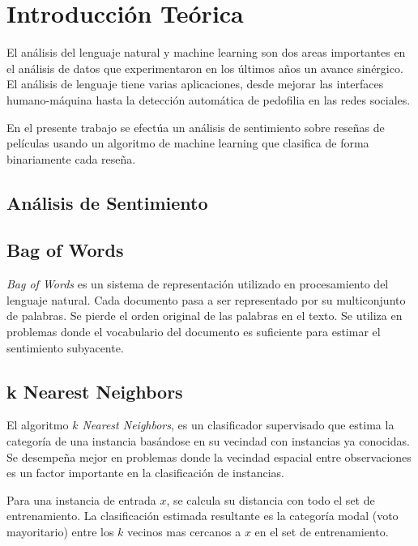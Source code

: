 \section{Introducción Teórica}%
\label{sec:introduccion_teorica}

El análisis del lenguaje natural y machine learning son dos areas
importantes en el análisis de datos que experimentaron en los últimos
años un avance sinérgico. El análisis de lenguaje tiene varias
aplicaciones, desde mejorar las interfaces humano-máquina hasta la
detección automática de pedofilia en las redes sociales.

En el presente trabajo se efectúa un análisis de sentimiento sobre
reseñas de películas usando un algoritmo de machine learning que
clasifica de forma binariamente cada reseña.

\subsection{Análisis de Sentimiento}%
\label{sub:analisis_de_sentimiento}

\subsection{Bag of Words}%
\label{sub:bag_of_words}

\textit{Bag of Words} es un sistema de representación utilizado en
procesamiento del lenguaje natural. Cada documento pasa a ser representado por
su multiconjunto de palabras. Se pierde el orden original de las palabras en el
texto. Se utiliza en problemas donde el vocabulario del documento es suficiente
para estimar el sentimiento subyacente.



\subsection{k Nearest Neighbors}%
\label{sub:k_nearest_neighbors}

El algoritmo \textit{$k$ Nearest Neighbors}, \knn{} es un clasificador
supervisado que estima la categoría de una instancia basándose en su vecindad
con instancias ya conocidas.
Se desempeña mejor en problemas donde la vecindad espacial entre
observaciones es un factor importante en la clasificación de instancias.

Para una instancia de entrada $x$, se calcula su distancia con todo el set de
entrenamiento. La clasificación estimada resultante es la categoría modal (voto
mayoritario) entre los $k$ vecinos mas cercanos a $x$ en el set de
entrenamiento.

